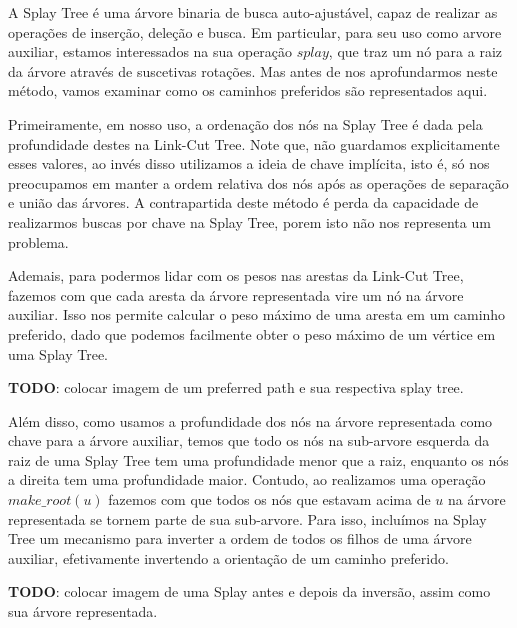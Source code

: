 A Splay Tree é uma árvore binaria de busca auto-ajustável, capaz de realizar as operações de inserção, deleção e busca. Em particular, para seu uso como arvore auxiliar, estamos interessados na sua operação $splay$, que traz um nó para a raiz da árvore através de suscetivas rotações. Mas antes de nos aprofundarmos neste método, vamos examinar como os caminhos preferidos são representados aqui.

Primeiramente, em nosso uso, a ordenação dos nós na Splay Tree é dada pela profundidade destes na Link-Cut Tree. Note que, não guardamos explicitamente esses valores, ao invés disso utilizamos a ideia de chave implícita, isto é, só nos preocupamos em manter a ordem relativa dos nós após as operações de separação e união das árvores. A contrapartida deste método é perda da capacidade de realizarmos buscas por chave na Splay Tree, porem isto não nos representa um problema.

Ademais, para podermos lidar com os pesos nas arestas da Link-Cut Tree, fazemos com que cada aresta da árvore representada vire um nó na árvore auxiliar. Isso nos permite calcular o peso máximo de uma aresta em um caminho preferido, dado que podemos facilmente obter o peso máximo de um vértice em uma Splay Tree.

\begin{center}
    \textbf{TODO}: colocar imagem de um preferred path e sua respectiva splay tree.
\end{center}

Além disso, como usamos a profundidade dos nós na árvore representada como chave para a árvore auxiliar, temos que todo os nós na sub-arvore esquerda da raiz de uma Splay Tree tem uma profundidade menor que a raiz, enquanto os nós a direita tem uma profundidade maior. Contudo, ao realizamos uma operação $make\_root(u)$ fazemos com que todos os nós que estavam acima de $u$ na árvore representada se tornem parte de sua sub-arvore. Para isso, incluímos na Splay Tree um mecanismo para inverter a ordem de todos os filhos de uma árvore auxiliar, efetivamente invertendo a orientação de um caminho preferido.

\begin{center}
    \textbf{TODO}: colocar imagem de uma Splay antes e depois da inversão, assim como sua árvore representada.
\end{center}

